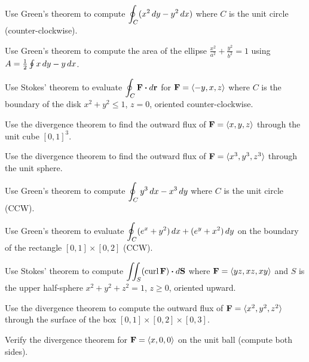 \documentclass[11pt]{article}
\begin{document}
\begin{problems}
\item Use Green's theorem to compute $\displaystyle \oint_C (x^2 \,dy - y^2 \,dx)$ where $C$ is the unit circle (counter-clockwise).
\item Use Green's theorem to compute the area of the ellipse $\tfrac{x^2}{a^2} + \tfrac{y^2}{b^2} = 1$ using $A = \tfrac{1}{2}\oint x \,dy - y \,dx$.
\item Use Stokes' theorem to evaluate $\displaystyle \oint_C \mathbf{F} \boldsymbol\cdot d\mathbf{r}$ for $\mathbf{F} = \langle -y, x, z\rangle$ where $C$ is the boundary of the disk $x^2 + y^2 \le 1$, $z = 0$, oriented counter-clockwise.
\item Use the divergence theorem to find the outward flux of $\mathbf{F} = \langle x, y, z\rangle$ through the unit cube $[0,1]^3$.
\item Use the divergence theorem to find the outward flux of $\mathbf{F} = \langle x^3, y^3, z^3\rangle$ through the unit sphere.
\end{problems}

\vfill
\newpage
{}
\begin{problems}
\item Use Green's theorem to compute $\displaystyle \oint_C y^3 \,dx - x^3 \,dy$ where $C$ is the unit circle (CCW).
\item Use Green's theorem to evaluate $\displaystyle \oint_C (e^x + y^2) \,dx + (e^y + x^2) \,dy$ on the boundary of the rectangle $[0,1]\times[0,2]$ (CCW).
\item Use Stokes' theorem to compute $\displaystyle \iint_S (\operatorname{curl} \mathbf{F})\boldsymbol\cdot d\mathbf{S}$ where $\mathbf{F} = \langle yz, xz, xy\rangle$ and $S$ is the upper half-sphere $x^2 + y^2 + z^2 = 1$, $z \ge 0$, oriented upward.
\item Use the divergence theorem to compute the outward flux of $\mathbf{F} = \langle x^2, y^2, z^2\rangle$ through the surface of the box $[0, 1] \times [0, 2] \times [0, 3]$.
\item Verify the divergence theorem for $\mathbf{F} = \langle x, 0, 0\rangle$ on the unit ball (compute both sides).
\end{problems}

\vfill
\newpage
{}
\end{document}
